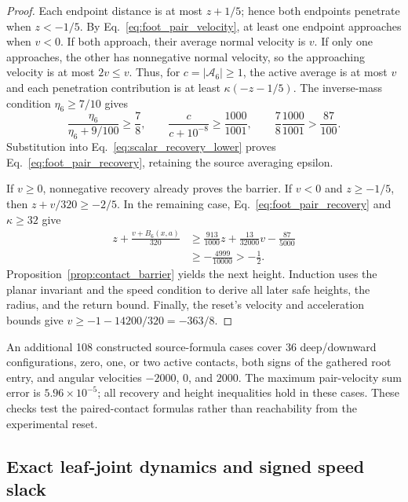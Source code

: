 \begin{proof}
Each endpoint distance is at most $z+1/5$; hence both endpoints penetrate when $z<-1/5$.
By Eq.~\eqref{eq:foot_pair_velocity}, at least one endpoint approaches when $v<0$.
If both approach, their average normal velocity is $v$.
If only one approaches, the other has nonnegative normal velocity, so the approaching velocity is at most $2v\le v$.
Thus, for $c=|\mathcal A_6|\ge1$, the active average is at most $v$ and each penetration contribution is at least $\kappa(-z-1/5)$.
The inverse-mass condition $\eta_6\ge7/10$ gives
\begin{equation}
 \frac{\eta_6}{\eta_6+9/100}\ge\frac78,
 \qquad \frac{c}{c+10^{-8}}\ge\frac{1000}{1001},
 \qquad \frac78\frac{1000}{1001}>\frac{87}{100}.
\end{equation}
Substitution into Eq.~\eqref{eq:scalar_recovery_lower} proves Eq.~\eqref{eq:foot_pair_recovery}, retaining the source averaging epsilon.

If $v\ge0$, nonnegative recovery already proves the barrier.
If $v<0$ and $z\ge-1/5$, then $z+v/320\ge-2/5$.
In the remaining case, Eq.~\eqref{eq:foot_pair_recovery} and $\kappa\ge32$ give
\begin{align}
 z+\frac{v+B_6(x,a)}{320}
 &\ge\frac{913}{1000}z+\frac{13}{32000}v-\frac{87}{5000}\\
 &\ge-\frac{4999}{10000}>-\frac12.
\end{align}
Proposition~\ref{prop:contact_barrier} yields the next height.
Induction uses the planar invariant and the speed condition to derive all later safe heights, the radius, and the return bound.
Finally, the reset's velocity and acceleration bounds give $v\ge-1-14200/320=-363/8$.
\end{proof}

An additional 108 constructed source-formula cases cover 36 deep/downward configurations, zero, one, or two active contacts, both signs of the gathered root entry, and angular velocities $-2000$, $0$, and $2000$.
The maximum pair-velocity sum error is $5.96\times10^{-5}$; all recovery and height inequalities hold in these cases.
These checks test the paired-contact formulas rather than reachability from the experimental reset.

\subsection{Exact leaf-joint dynamics and signed speed slack}
\label{app:foot_joint}

